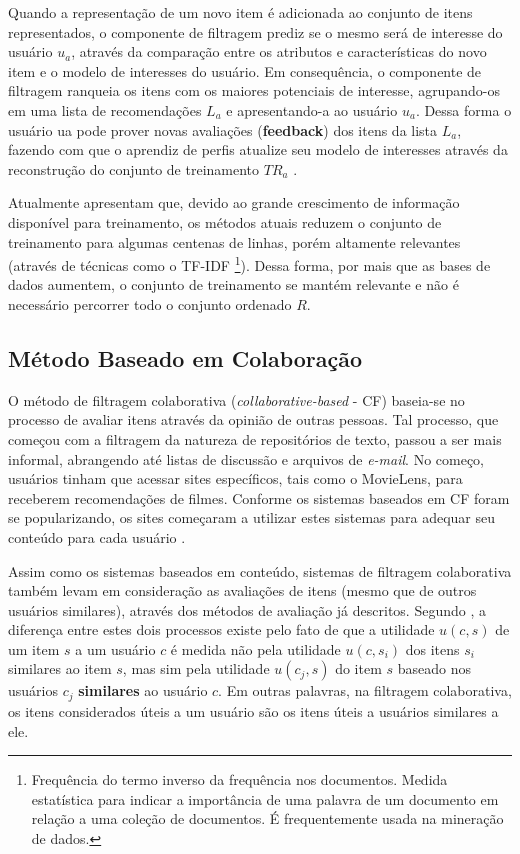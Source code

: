 Quando a representação de um novo item é adicionada ao conjunto de itens representados, o componente de filtragem prediz se o mesmo será de interesse do usuário $u_{a}$, através da comparação entre os atributos e características do novo item e o modelo de interesses do usuário. Em consequência, o componente de filtragem ranqueia os itens com os maiores potenciais de interesse, agrupando-os em uma lista de recomendações $L_{a}$ e apresentando-a ao usuário $u_{a}$. Dessa forma o usuário ua pode prover novas avaliações (\textbf{feedback}) dos itens da lista $L_{a}$, fazendo com que o aprendiz de perfis atualize seu modelo de interesses através da reconstrução do conjunto de treinamento $TR_{a}$ \cite{lops2011content}.

Atualmente  apresentam que, devido ao grande crescimento de informação disponível para treinamento, os métodos atuais reduzem o conjunto de treinamento para algumas centenas de linhas, porém altamente relevantes (através de técnicas como o TF-IDF \footnote{Frequência do termo inverso da frequência nos documentos. Medida estatística para indicar a importância de uma palavra de um documento em relação a uma coleção de documentos. É frequentemente usada na mineração de dados.}). Dessa forma, por mais que as bases de dados aumentem, o conjunto de treinamento se mantém relevante e não é necessário percorrer todo o conjunto ordenado $R$.

\subsection{Método Baseado em Colaboração} \label{recs:collaborative_based}

O método de filtragem colaborativa (\textit{collaborative-based} - CF) baseia-se no processo de avaliar itens através da opinião de outras pessoas. Tal processo, que começou com a filtragem da natureza de repositórios de texto, passou a ser mais informal, abrangendo até listas de discussão e arquivos de \textit{e-mail}. No começo, usuários tinham que acessar sites específicos, tais como o MovieLens, para receberem recomendações de filmes. Conforme os sistemas baseados em CF foram se popularizando, os sites começaram a utilizar estes sistemas para adequar seu conteúdo para cada usuário \cite{schafer2007collaborative}.

Assim como os sistemas baseados em conteúdo, sistemas de filtragem colaborativa também levam em consideração as avaliações de itens (mesmo que de outros usuários similares), através dos métodos de avaliação já descritos. Segundo , a diferença entre estes dois processos existe pelo fato de que a utilidade $u(c,s)$ de um item $s$ a um usuário $c$ é medida não pela utilidade $u(c,s_{i})$ dos itens $s_{i}$ similares ao item $s$, mas sim pela utilidade $u(c_{j}, s)$ do item $s$ baseado nos usuários $c_{j}$ \textbf{similares} ao usuário $c$. Em outras palavras, na filtragem colaborativa, os itens considerados úteis a um usuário são os itens úteis a usuários similares a ele.

